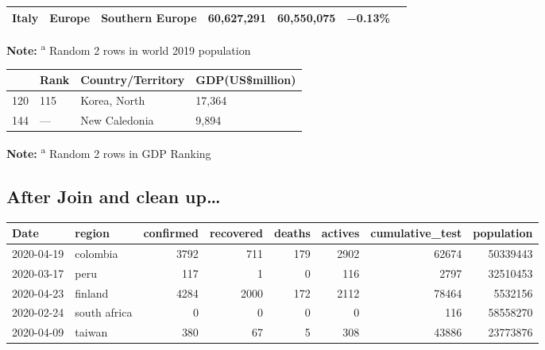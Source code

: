 \documentclass[
  11pt,
]{article}
\begin{document}
\begin{longtable}[]{@{}lllllll@{}}
\begin{minipage}[t]{0.11\columnwidth}
Italy\strut
\end{minipage} & \begin{minipage}[t]{0.16\columnwidth}\raggedright
Europe\strut
\end{minipage} & \begin{minipage}[t]{0.16\columnwidth}\raggedright
Southern Europe\strut
\end{minipage} & \begin{minipage}[t]{0.16\columnwidth}\raggedright
60,627,291\strut
\end{minipage} & \begin{minipage}[t]{0.16\columnwidth}\raggedright
60,550,075\strut
\end{minipage} & \begin{minipage}[t]{0.05\columnwidth}\raggedright
−0.13\%\strut
\end{minipage}\tabularnewline
\bottomrule
\end{longtable}

\textbf{Note:} \textsuperscript{a} Random 2 rows in world 2019
population

\begin{longtable}[]{@{}llll@{}}
\toprule
& Rank & Country/Territory & GDP(US\$million)\tabularnewline
\midrule
\endhead
120 & 115 & Korea, North & 17,364\tabularnewline
144 & --- & New Caledonia & 9,894\tabularnewline
\bottomrule
\end{longtable}

\textbf{Note:} \textsuperscript{a} Random 2 rows in GDP Ranking

\hypertarget{after-join-and-clean-up}{%
\subsection{After Join and clean
up\ldots{}}\label{after-join-and-clean-up}}

\begin{longtable}[]{@{}llrrrrrr@{}}
\toprule
Date & region & confirmed & recovered & deaths & actives &
cumulative\_test & population\tabularnewline
\midrule
\endhead
2020-04-19 & colombia & 3792 & 711 & 179 & 2902 & 62674 &
50339443\tabularnewline
2020-03-17 & peru & 117 & 1 & 0 & 116 & 2797 & 32510453\tabularnewline
2020-04-23 & finland & 4284 & 2000 & 172 & 2112 & 78464 &
5532156\tabularnewline
2020-02-24 & south africa & 0 & 0 & 0 & 0 & 116 &
58558270\tabularnewline
2020-04-09 & taiwan & 380 & 67 & 5 & 308 & 43886 &
23773876\tabularnewline
\bottomrule
\end{longtable}
\end{document}
